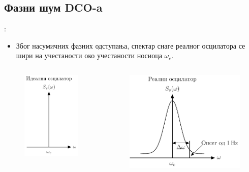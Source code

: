\documentclass[aspectratio=169]{beamer}
\def \DCO  {DCO} %
\begin{document}
\subsection{Фазни шум \DCO-a}

\begin{frame}{\secname: \subsecname}
    \begin{itemize}
        \item Због насумичних фазних одступања, спектар снаге реалног осцилатора се шири на учестаности око учестаности носиоца $\omega_c$.
    \end{itemize}
    \begin{columns}[t]
        \begin{column}{0.5\textwidth}
            \begin{figure}[!t]
            	\centering
            	\includegraphics[scale=0.8]{slike/prezentacija/osc_noise_1_1.pdf}
            \end{figure}
		\end{column}
		\begin{column}{0.5\textwidth}
            \begin{figure}[!t]
            	\centering
            	\includegraphics[scale=0.8]{slike/prezentacija/osc_noise_1_2.pdf}

\end{figure}
\end{column}
\end{columns}
\end{frame}
\end{document}
